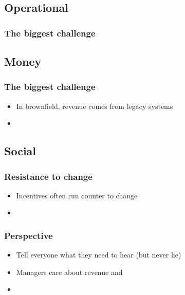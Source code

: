 \documentclass[t]{beamer}
\begin{document}
\subsection{Operational}

\begin{frame}
	\frametitle{The biggest challenge}
	\begin{itemize}
	\end{itemize}
\end{frame}

\subsection{Money}

\begin{frame}
	\frametitle{The biggest challenge}
	\begin{itemize}
		\item In brownfield, revenue comes from legacy systems
		\item 
	\end{itemize}
\end{frame}

\subsection{Social}

\begin{frame}
	\frametitle{Resistance to change}
	\begin{itemize}
		\item Incentives often run counter to change
		\item 
	\end{itemize}
\end{frame}

\begin{frame}
	\frametitle{Perspective}
	\begin{itemize}
		\item Tell everyone what they need to hear (but never lie)
		\item Managers care about revenue and %
		\item 
	\end{itemize}
\end{frame}
\end{document}

